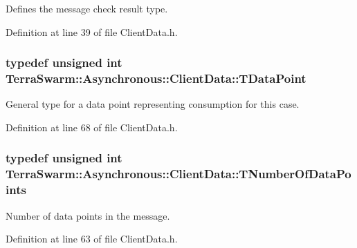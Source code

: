 Defines the message check result type. 



Definition at line 39 of file Client\-Data.\-h.

\hypertarget{class_terra_swarm_1_1_asynchronous_1_1_client_data_ac733720fed15e940f991de44f1bb514e}{
\subsubsection[{T\-Data\-Point}]{\setlength{\rightskip}{0pt plus 5cm}typedef unsigned int {\bf Terra\-Swarm\-::\-Asynchronous\-::\-Client\-Data\-::\-T\-Data\-Point}}}\label{class_terra_swarm_1_1_asynchronous_1_1_client_data_ac733720fed15e940f991de44f1bb514e}


General type for a data point representing consumption for this case. 



Definition at line 68 of file Client\-Data.\-h.

\hypertarget{class_terra_swarm_1_1_asynchronous_1_1_client_data_a690994afd0ba9b8eeb56ae679a5c64e8}{
\subsubsection[{T\-Number\-Of\-Data\-Points}]{\setlength{\rightskip}{0pt plus 5cm}typedef unsigned int {\bf Terra\-Swarm\-::\-Asynchronous\-::\-Client\-Data\-::\-T\-Number\-Of\-Data\-Points}}}\label{class_terra_swarm_1_1_asynchronous_1_1_client_data_a690994afd0ba9b8eeb56ae679a5c64e8}


Number of data points in the message. 



Definition at line 63 of file Client\-Data.\-h.

